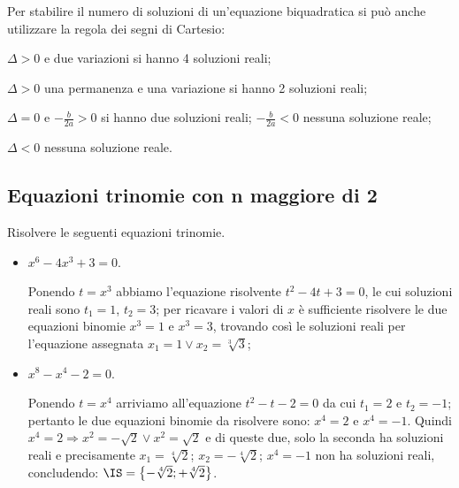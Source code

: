 Per stabilire il numero di soluzioni di un'equazione biquadratica si può anche utilizzare la regola dei segni di Cartesio:
\begin{itemize*}
\item $\Delta >0$ e due variazioni si hanno 4 soluzioni reali;
\item $\Delta >0$ una permanenza e una variazione si hanno 2 soluzioni reali;
\item $\Delta =0$ e $-\frac b{2a}>0$ si hanno due soluzioni reali; $-\frac b{2a}<0$ nessuna soluzione reale;
\item $\Delta <0$ nessuna soluzione reale.
\end{itemize*}

\ovalbox{\risolvii \ref{ese:5.21}, \ref{ese:5.22}, \ref{ese:5.23}, \ref{ese:5.24}, \ref{ese:5.25}, \ref{ese:5.26}, \ref{ese:5.27}, \ref{ese:5.28}, \ref{ese:5.29}, \ref{ese:5.30}, \ref{ese:5.31}}

\subsection{Equazioni trinomie con n maggiore di 2}
\begin{exrig}
\begin{esempio}
Risolvere le seguenti equazioni trinomie.
\begin{itemize}
\item $ x^6-4x^3+3=0 $.

Ponendo $t=x^3$ abbiamo l’equazione risolvente $t^2-4t+3=0$, le cui soluzioni reali sono $t_1=1$, $t_2=3$; per ricavare i valori di $x$ è sufficiente risolvere le due equazioni binomie $x^3=1$ e $x^3=3$, trovando così le soluzioni reali per l’equazione assegnata $x_1=1\vee x_2=\sqrt[3]3$;

\item $ x^8-x^4-2=0 $.

Ponendo $t=x^4$ arriviamo all’equazione $t^2-t-2=0$ da cui $t_1=2$ e $t_2=-1$; pertanto le due equazioni binomie da risolvere sono: $x^4=2$ e $x^4=-1$. Quindi $x^4=2\Rightarrow x^2=-\sqrt 2\vee x^2=\sqrt 2$ e di queste due, solo la seconda ha soluzioni reali e precisamente $x_1=\sqrt[4]2$; $x_2=-\sqrt[4]2$; $x^4=-1$ non ha soluzioni reali, concludendo: $\IS=\left\{-\sqrt[4]2;+\sqrt[4]2\right\}$.
\end{itemize}
\end{esempio}
\end{exrig}
\ovalbox{\risolvii \ref{ese:5.32}, \ref{ese:5.33}}

